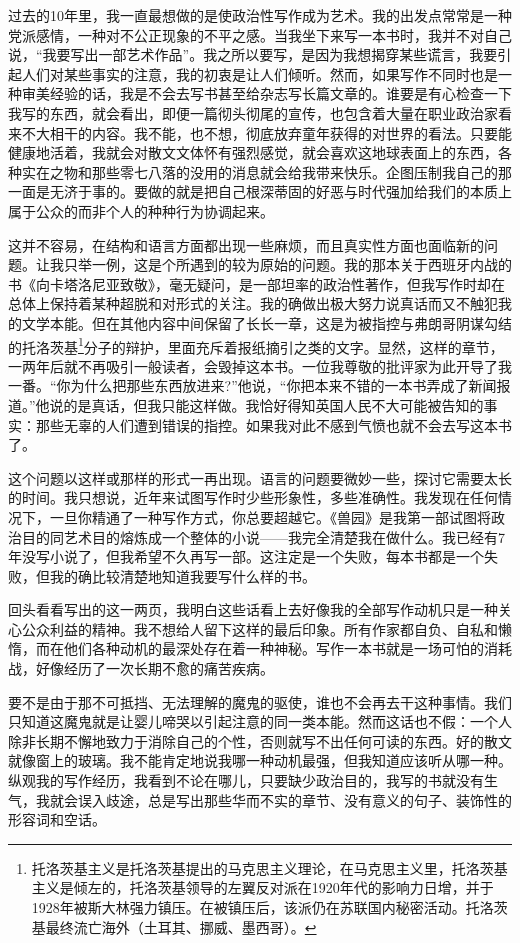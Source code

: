 \documentclass[fontset=fandol,12pt,a5paper]{ctexbook}
\begin{document}
过去的10年里，我一直最想做的是使政治性写作成为艺术。我的出发点常常是一种党派感情，一种对不公正现象的不平之感。当我坐下来写一本书时，我并不对自己说，“我要写出一部艺术作品”。我之所以要写，是因为我想揭穿某些谎言，我要引起人们对某些事实的注意，我的初衷是让人们倾听。然而，如果写作不同时也是一种审美经验的话，我是不会去写书甚至给杂志写长篇文章的。谁要是有心检查一下我写的东西，就会看出，即便一篇彻头彻尾的宣传，也包含着大量在职业政治家看来不大相干的内容。我不能，也不想，彻底放弃童年获得的对世界的看法。只要能健康地活着，我就会对散文文体怀有强烈感觉，就会喜欢这地球表面上的东西，各种实在之物和那些零七八落的没用的消息就会给我带来快乐。企图压制我自己的那一面是无济于事的。要做的就是把自己根深蒂固的好恶与时代强加给我们的本质上属于公众的而非个人的种种行为协调起来。

这并不容易，在结构和语言方面都出现一些麻烦，而且真实性方面也面临新的问题。让我只举一例，这是个所遇到的较为原始的问题。我的那本关于西班牙内战的书《向卡塔洛尼亚致敬》，毫无疑问，是一部坦率的政治性著作，但我写作时却在总体上保持着某种超脱和对形式的关注。我的确做出极大努力说真话而又不触犯我的文学本能。但在其他内容中间保留了长长一章，这是为被指控与弗朗哥阴谋勾结的托洛茨基\footnote{托洛茨基主义是托洛茨基提出的马克思主义理论，在马克思主义里，托洛茨基主义是倾左的，托洛茨基领导的左翼反对派在1920年代的影响力日增，并于1928年被斯大林强力镇压。在被镇压后，该派仍在苏联国内秘密活动。托洛茨基最终流亡海外（土耳其、挪威、墨西哥）。}分子的辩护，里面充斥着报纸摘引之类的文字。显然，这样的章节，一两年后就不再吸引一般读者，会毁掉这本书。一位我尊敬的批评家为此开导了我一番。“你为什么把那些东西放进来?”他说，“你把本来不错的一本书弄成了新闻报道。”他说的是真话，但我只能这样做。我恰好得知英国人民不大可能被告知的事实：那些无辜的人们遭到错误的指控。如果我对此不感到气愤也就不会去写这本书了。

这个问题以这样或那样的形式一再出现。语言的问题要微妙一些，探讨它需要太长的时间。我只想说，近年来试图写作时少些形象性，多些准确性。我发现在任何情况下，一旦你精通了一种写作方式，你总要超越它。《兽园》是我第一部试图将政治目的同艺术目的熔炼成一个整体的小说——我完全清楚我在做什么。我已经有7年没写小说了，但我希望不久再写一部。这注定是一个失败，每本书都是一个失败，但我的确比较清楚地知道我要写什么样的书。

回头看看写出的这一两页，我明白这些话看上去好像我的全部写作动机只是一种关心公众利益的精神。我不想给人留下这样的最后印象。所有作家都自负、自私和懒惰，而在他们各种动机的最深处存在着一种神秘。写作一本书就是一场可怕的消耗战，好像经历了一次长期不愈的痛苦疾病。

要不是由于那不可抵挡、无法理解的魔鬼的驱使，谁也不会再去干这种事情。我们只知道这魔鬼就是让婴儿啼哭以引起注意的同一类本能。然而这话也不假：一个人除非长期不懈地致力于消除自己的个性，否则就写不出任何可读的东西。好的散文就像窗上的玻璃。我不能肯定地说我哪一种动机最强，但我知道应该听从哪一种。纵观我的写作经历，我看到不论在哪儿，只要缺少政治目的，我写的书就没有生气，我就会误入歧途，总是写出那些华而不实的章节、没有意义的句子、装饰性的形容词和空话。
\end{document}
